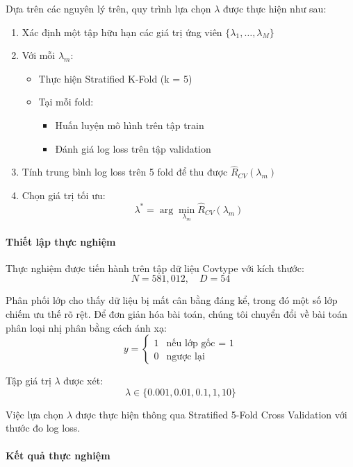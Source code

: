 Dựa trên các nguyên lý trên, quy trình lựa chọn $\lambda$ được thực hiện như sau:

\begin{enumerate}
    \item Xác định một tập hữu hạn các giá trị ứng viên $\{\lambda_1, \dots, \lambda_M\}$
    
    \item Với mỗi $\lambda_m$:
    \begin{itemize}
        \item Thực hiện Stratified K-Fold (k = 5)
        \item Tại mỗi fold:
        \begin{itemize}
            \item Huấn luyện mô hình trên tập train
            \item Đánh giá log loss trên tập validation
        \end{itemize}
    \end{itemize}
    
    \item Tính trung bình log loss trên 5 fold để thu được $\hat{R}_{CV}(\lambda_m)$
    
    \item Chọn giá trị tối ưu:
    \[
    \lambda^* = \arg\min_{\lambda_m} \hat{R}_{CV}(\lambda_m)
    \]
\end{enumerate}

\paragraph{Thiết lập thực nghiệm}

Thực nghiệm được tiến hành trên tập dữ liệu Covtype với kích thước:
\[
N = 581{,}012, \quad D = 54
\]

Phân phối lớp cho thấy dữ liệu bị mất cân bằng đáng kể, trong đó một số lớp chiếm ưu thế rõ rệt. Để đơn giản hóa bài toán, chúng tôi chuyển đổi về bài toán phân loại nhị phân bằng cách ánh xạ:
\[
y = 
\begin{cases}
1 & \text{nếu lớp gốc = 1} \\
0 & \text{ngược lại}
\end{cases}
\]

Tập giá trị $\lambda$ được xét:
\[
\lambda \in \{0.001, 0.01, 0.1, 1, 10\}
\]

Việc lựa chọn $\lambda$ được thực hiện thông qua Stratified 5-Fold Cross Validation với thước đo log loss.

\paragraph{Kết quả thực nghiệm}

